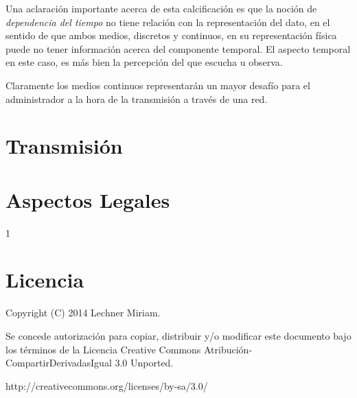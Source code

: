 \documentclass[12pt]{article}
\begin{document}
Una aclaración importante acerca de esta calcificación es que la noción 
de {\it dependencia del tiempo} no tiene relación con la representación
del dato, en el sentido de que ambos medios, discretos y continuos, en su 
representación física puede no tener información acerca del componente 
temporal. El aspecto temporal en este caso, es más bien la percepción del 
que escucha u observa.\cite{ramyer}  

Claramente los medios continuos representarán un mayor desafío para el 
administrador a la hora de la transmisión a través de una red.   


\section*{Transmisión}


\section*{Aspectos Legales}

{1}

\section*{Licencia}
Copyright (C) 2014 Lechner Miriam.

Se concede autorización para copiar, distribuir y/o modificar este documento
bajo los términos de la Licencia Creative Commons Atribución-CompartirDerivadasIgual 3.0 Unported. 

http://creativecommons.org/licenses/by-sa/3.0/
\end{document}
